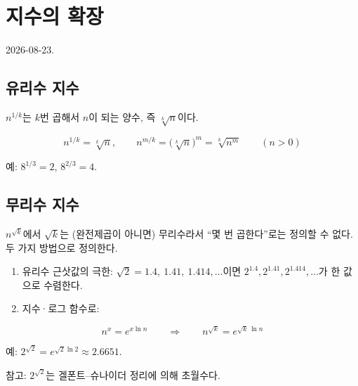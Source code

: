 \section{지수의 확장}

2026-08-23.

\subsection{유리수 지수}

\(n^{1/k}\)는 \(k\)번 곱해서 \(n\)이 되는 양수, 즉 \(\sqrt[k]{n}\)이다.

\[
n^{1/k}=\sqrt[k]{n},\qquad n^{m/k}=\big(\sqrt[k]{n}\big)^m=\sqrt[k]{n^m}\qquad(n>0)
\]

예: \(8^{1/3}=2\), \(8^{2/3}=4\).

\subsection{무리수 지수}

\(n^{\sqrt k}\)에서 \(\sqrt k\)는 (완전제곱이 아니면) 무리수라서 ``몇 번
곱한다''로는 정의할 수 없다. 두 가지 방법으로 정의한다.

\begin{enumerate}
\def\labelenumi{\arabic{enumi}.}
\tightlist
\item
  유리수 근삿값의 극한: \(\sqrt2=1.4,\ 1.41,\ 1.414,\dots\)이면
  \(2^{1.4},2^{1.41},2^{1.414},\dots\)가 한 값으로 수렴한다.
\item
  지수·로그 함수로:
\end{enumerate}

\[
n^{x}=e^{x\ln n}\qquad\Rightarrow\qquad n^{\sqrt k}=e^{\sqrt k\,\ln n}
\]

예: \(2^{\sqrt2}=e^{\sqrt2\ln2}\approx2.6651\).

참고: \(2^{\sqrt2}\)는 겔폰트--슈나이더 정리에 의해 초월수다.
